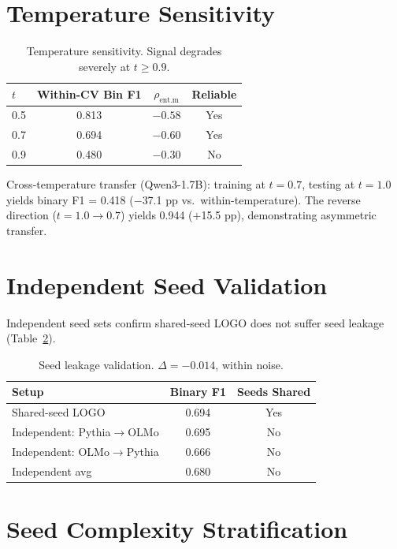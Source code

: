 \documentclass[11pt,a4paper]{article}
\begin{document}
\section{Temperature Sensitivity}
\label{app:temp}

\begin{table}[h]
\centering
\small
\begin{tabular}{lccc}
\toprule
\textbf{$t$} & \textbf{Within-CV Bin F1} & \textbf{$\rho_\text{ent.m}$} & \textbf{Reliable} \\
\midrule
0.5 & 0.813 & $-0.58$ & Yes \\
0.7 & 0.694 & $-0.60$ & Yes \\
0.9 & 0.480 & $-0.30$ & No \\
\bottomrule
\end{tabular}
\caption{Temperature sensitivity. Signal degrades severely at $t \geq 0.9$.}
\label{tab:temp_app}
\end{table}

Cross-temperature transfer (Qwen3-1.7B): training at $t = 0.7$, testing at $t = 1.0$ yields binary F1 = 0.418 ($-$37.1 pp vs.\ within-temperature). The reverse direction ($t = 1.0 \to 0.7$) yields 0.944 ($+$15.5 pp), demonstrating asymmetric transfer.

\section{Independent Seed Validation}
\label{app:seed_val}

Independent seed sets confirm shared-seed LOGO does not suffer seed leakage (Table~\ref{tab:seed_val}).

\begin{table}[h]
\centering
\small
\begin{tabular}{lcc}
\toprule
\textbf{Setup} & \textbf{Binary F1} & \textbf{Seeds Shared} \\
\midrule
Shared-seed LOGO & 0.694 & Yes \\
Independent: Pythia$\to$OLMo & 0.695 & No \\
Independent: OLMo$\to$Pythia & 0.666 & No \\
Independent avg & 0.680 & No \\
\bottomrule
\end{tabular}
\caption{Seed leakage validation. $\Delta = -0.014$, within noise.}
\label{tab:seed_val}
\end{table}

\section{Seed Complexity Stratification}
\label{app:seed_complex}
\end{document}
